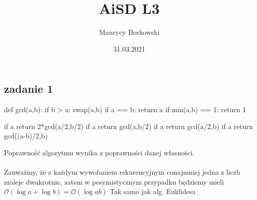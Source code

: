 \documentclass{article}
\title{AiSD L3}
\date{31.03.2021}
\author{Maurycy Borkowski}
\begin{document}
\maketitle
\subsection*{zadanie 1}
\begin{python}
def gcd(a,b):
    if b > a:
        swap(a,b)
    if a == b:
        return a
    if min(a,b) == 1:
        return 1

    if a%
        return 2*gcd(a/2,b/2)
    if a%
        return gcd(a,b/2)
    if a%
        return gcd(a/2,b)
    if a%
        return gcd((a-b)/2,b)
\end{python}
Poprawność algorytmu wynika z poprawności danej własności.\\\\
Zauważmy, że z każdym wywołaniem rekurencyjnym conajmniej jedna z liczb maleje dwukrotnie, zatem w pesymistycznym przypadku będziemy mieli $\mathcal{O}(\log{a} + \log{b}) = \mathcal{O}(\log{ab})$ Tak samo jak alg. Euklidesa\\\\
\clearpage
\end{document}
